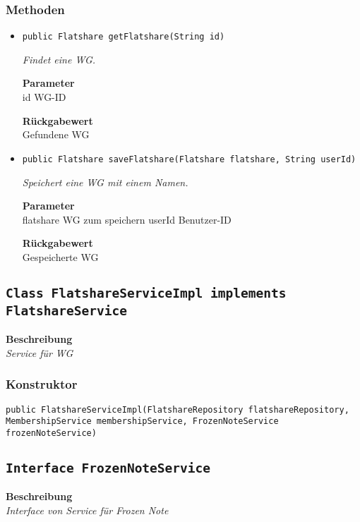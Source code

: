     \subsubsection{Methoden}
    \begin{itemize}
    	\item{\texttt{public Flatshare getFlatshare(String id)}}
    	
    	\textit{Findet eine WG.}
    	
    	\textbf{Parameter} \\
    	id WG-ID
    	
    	\textbf{Rückgabewert} \\
    	Gefundene WG        \item{\texttt{public Flatshare saveFlatshare(Flatshare flatshare, String userId)}}
    	
    	\textit{Speichert eine WG mit einem Namen.}
    	
    	\textbf{Parameter} \\
    	flatshare WG zum speichern
    	userId Benutzer-ID
    	
    	\textbf{Rückgabewert} \\
    	Gespeicherte WG
    \end{itemize}
    \subsection{\texttt{Class FlatshareServiceImpl implements FlatshareService}}
    \textbf{Beschreibung} \\
    \textit{Service für WG}
    \subsubsection{Konstruktor}
    \texttt{public FlatshareServiceImpl(FlatshareRepository flatshareRepository, MembershipService membershipService, FrozenNoteService frozenNoteService)}
    \subsection{\texttt{Interface FrozenNoteService}}
    \textbf{Beschreibung} \\
    \textit{Interface von Service für Frozen Note}
